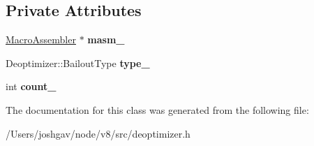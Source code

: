 \subsection*{Private Attributes}
\begin{DoxyCompactItemize}
\item 
\hyperlink{classv8_1_1internal_1_1_macro_assembler}{Macro\+Assembler} $\ast$ {\bfseries masm\+\_\+}\hypertarget{classv8_1_1internal_1_1_deoptimizer_1_1_b_a_s_e___e_m_b_e_d_d_e_d_a86f30911483266971a1c7d9afecb86ad}{}\label{classv8_1_1internal_1_1_deoptimizer_1_1_b_a_s_e___e_m_b_e_d_d_e_d_a86f30911483266971a1c7d9afecb86ad}

\item 
Deoptimizer\+::\+Bailout\+Type {\bfseries type\+\_\+}\hypertarget{classv8_1_1internal_1_1_deoptimizer_1_1_b_a_s_e___e_m_b_e_d_d_e_d_a6cbd9186ff5e497be64f86ed6e0874d1}{}\label{classv8_1_1internal_1_1_deoptimizer_1_1_b_a_s_e___e_m_b_e_d_d_e_d_a6cbd9186ff5e497be64f86ed6e0874d1}

\item 
int {\bfseries count\+\_\+}\hypertarget{classv8_1_1internal_1_1_deoptimizer_1_1_b_a_s_e___e_m_b_e_d_d_e_d_a6f6935332d50264a4c2f0fea4313d2e3}{}\label{classv8_1_1internal_1_1_deoptimizer_1_1_b_a_s_e___e_m_b_e_d_d_e_d_a6f6935332d50264a4c2f0fea4313d2e3}

\end{DoxyCompactItemize}


The documentation for this class was generated from the following file\+:\begin{DoxyCompactItemize}
\item 
/\+Users/joshgav/node/v8/src/deoptimizer.\+h\end{DoxyCompactItemize}
